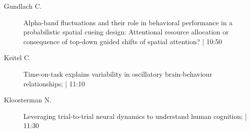 \begin{symposium}
\begin{description}
                \item [ Gundlach C.] Alpha-band fluctuations and their role in behavioral performance in a probabilistic spatial cueing design: Attentional resource allocation or consequence of top-down guided shifts of spatial attention? \textcolor{mygray}{ | 10:50}    
                
                \item [ Keitel C.] Time-on-task explains variability in oscillatory brain-behaviour relationships; \textcolor{mygray}{ | 11:10}    
                
                \item [ Kloosterman N.] Leveraging trial-to-trial neural dynamics to understand human cognition; \textcolor{mygray}{ | 11:30}    
                
            \end{description} 
            \end{symposium}
            